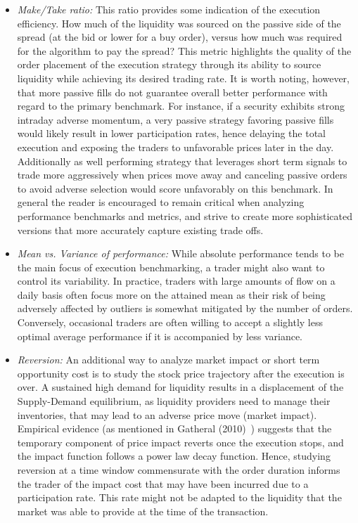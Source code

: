 \begin{itemize}
\item \emph{Make/Take ratio:} This ratio provides some indication of the execution efficiency. How much of the liquidity was sourced on the passive side of the spread (at the bid or lower for a buy order), versus how much was required for the algorithm to pay the spread? This metric highlights the quality of the order placement of the execution strategy through its ability to source liquidity while achieving its desired trading rate. It is worth noting, however, that more passive fills do not guarantee overall better performance with regard to the primary benchmark. For instance, if a security exhibits strong intraday adverse momentum, a very passive strategy favoring passive fills would likely result in lower participation rates, hence delaying the total execution and exposing the traders to unfavorable prices later in the day. Additionally as well performing strategy that leverages short term signals to trade more aggressively when prices move away and canceling passive orders to avoid adverse selection would score unfavorably on this benchmark. In general the reader is encouraged to remain critical when analyzing performance benchmarks and metrics, and strive to create more sophisticated versions that more accurately capture existing trade offs.

\item \emph{Mean vs. Variance of performance:} While absolute performance tends to be the main focus of execution benchmarking, a trader might also want to control its variability. In practice, traders with large amounts of flow on a daily basis often focus more on the attained mean as their risk of being adversely affected by outliers is somewhat mitigated by the number of orders. Conversely, occasional traders are often willing to accept a slightly less optimal average performance if it is accompanied by less variance.

\item \emph{Reversion:} An additional way to analyze market impact or short term opportunity cost is to study the stock price trajectory after the execution is over. A sustained high demand for liquidity results in a displacement of the Supply-Demand equilibrium, as liquidity providers need to manage their inventories, that may lead to an adverse price move (market impact). Empirical evidence (as mentioned in Gatheral (2010)~\cite{gatheral}) suggests that the temporary component of price impact reverts once the execution stops, and the impact function follows a power law decay function. Hence, studying reversion at a time window commensurate with the order duration informs the trader of the impact cost that may have been incurred due to a participation rate. This rate might not be adapted to the liquidity that the market was able to provide at the time of the transaction.



\end{itemize}
